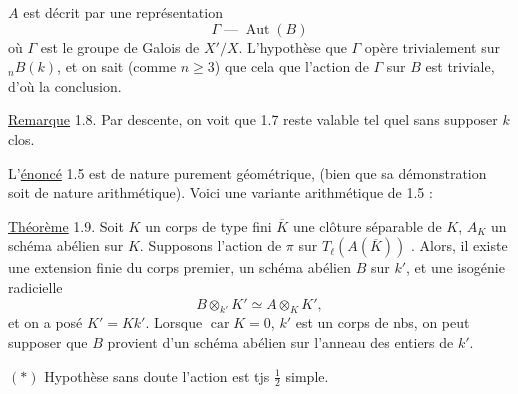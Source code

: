 $A$ est décrit par une représentation
\[
\Gamma\mathrel{\text{---}}\operatorname{Aut}(B)
\]
où $\Gamma$ est le groupe de Galois de $X'/X$. L'hypothèse  que $\Gamma$ opère trivialement sur ${}_n B(k)$, et on sait  (comme $n\geq3$) que cela  que l'action de $\Gamma$ sur $B$ est triviale, d'où la conclusion.

\uline{Remarque} 1.8.  Par descente, on voit que 1.7 reste valable tel quel sans supposer $k$   clos.

L'\uline{énoncé} 1.5 est de nature purement géométrique, (bien que sa démonstration soit de nature arithmétique). Voici une variante arithmétique de 1.5 :

\uline{Théorème} 1.9. Soit $K$ un corps de type fini  $\overline K$ une clôture séparable de $K$,  $A_K$ un schéma abélien sur $K$. Supposons l'action de $\pi$ sur $T_\ell(A(\overline K))$  . Alors, il existe une extension finie   du corps premier,   un schéma abélien $B$ sur $k'$, et une isogénie radicielle 
\[
B\otimes_{k'}K'\simeq A\otimes_K K',
\]
et on a posé \deleted{\unsure{$\ell$}} $K'=Kk'$. Lorsque $\operatorname{car}K=0$,   $k'$ est  un corps de nbs, on peut supposer que $B$  provient d'un schéma abélien sur  l'anneau des entiers de $k'$.

$(*)$ Hypothèse sans doute     l'action est tjs $\frac12$ simple.
